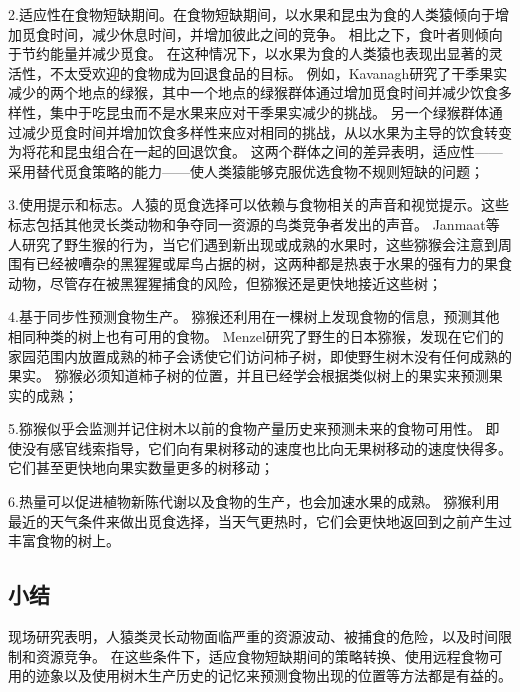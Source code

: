 2.适应性在食物短缺期间。在食物短缺期间，以水果和昆虫为食的人类猿倾向于增加觅食时间，减少休息时间，并增加彼此之间的竞争\cite{kavanagh1978diet}。
相比之下，食叶者则倾向于节约能量并减少觅食。
在这种情况下，以水果为食的人类猿也表现出显著的灵活性，不太受欢迎的食物成为回退食品的目标。
例如，Kavanagh\cite{kavanagh1978diet}研究了干季果实减少的两个地点的绿猴，其中一个地点的绿猴群体通过增加觅食时间并减少饮食多样性，集中于吃昆虫而不是水果来应对干季果实减少的挑战。
另一个绿猴群体通过减少觅食时间并增加饮食多样性来应对相同的挑战，从以水果为主导的饮食转变为将花和昆虫组合在一起的回退饮食。
这两个群体之间的差异表明，适应性——采用替代觅食策略的能力——使人类猿能够克服优选食物不规则短缺的问题；\par

3.使用提示和标志。人猿的觅食选择可以依赖与食物相关的声音和视觉提示。这些标志包括其他灵长类动物和争夺同一资源的鸟类竞争者发出的声音。
Janmaat等人\cite{janmaat2006primates}研究了野生猴的行为，当它们遇到新出现或成熟的水果时，这些猕猴会注意到周围有已经被嘈杂的黑猩猩或犀鸟占据的树，这两种都是热衷于水果的强有力的果食动物，尽管存在被黑猩猩捕食的风险，但猕猴还是更快地接近这些树；\par


4.基于同步性预测食物生产。
猕猴还利用在一棵树上发现食物的信息，预测其他相同种类的树上也有可用的食物。
Menzel\cite{menzel1991cognitive}研究了野生的日本猕猴，发现在它们的家园范围内放置成熟的柿子会诱使它们访问柿子树，即使野生树木没有任何成熟的果实。
猕猴必须知道柿子树的位置，并且已经学会根据类似树上的果实来预测果实的成熟；\par


5.猕猴似乎会监测并记住树木以前的食物产量历史来预测未来的食物可用性\cite{milton1988foraging}。
即使没有感官线索指导，它们向有果树移动的速度也比向无果树移动的速度快得多。它们甚至更快地向果实数量更多的树移动\cite{zuberbuhler2010foraging}；\par


6.热量可以促进植物新陈代谢以及食物的生产，也会加速水果的成熟。
猕猴利用最近的天气条件来做出觅食选择，当天气更热时，它们会更快地返回到之前产生过丰富食物的树上\cite{janmaat2006primates}。



\subsection{小结}
现场研究表明，人猿类灵长动物面临严重的资源波动、被捕食的危险，以及时间限制和资源竞争。
在这些条件下，适应食物短缺期间的策略转换、使用远程食物可用的迹象以及使用树木生产历史的记忆来预测食物出现的位置等方法都是有益的。


